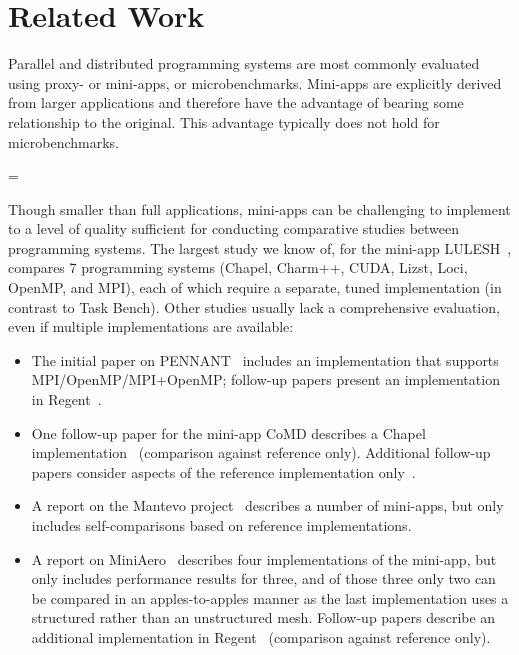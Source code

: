 \section{Related Work}
\label{sec:related-work}

{}

Parallel and distributed programming systems are most
commonly evaluated using proxy- or mini-apps, or
microbenchmarks. Mini-apps are explicitly derived from larger
applications and therefore have the advantage of bearing some
relationship to the original. This advantage typically does not hold
for microbenchmarks.

\brokenpenalty=\oldbrokenpenalty

Though smaller than full applications, mini-apps can be challenging to
implement to a level of quality sufficient for conducting comparative
studies between programming systems. The largest study we know of,
for the mini-app LULESH~\cite{LULESH13}, compares 7 programming
systems (Chapel, Charm++, CUDA, Lizst, Loci, OpenMP, and MPI), each of
which require a separate, tuned implementation (in contrast to
Task Bench). Other
studies usually lack a comprehensive evaluation, even if multiple
implementations are available:

\begin{itemize}

\item
The initial paper on PENNANT~\cite{PENNANT} includes an
implementation that supports MPI/OpenMP/MPI+OpenMP; follow-up papers present an implementation in
Regent~\cite{Regent15, ControlReplication17, LegionTracing18}.

\item
One follow-up paper for the mini-app CoMD describes a Chapel
implementation~\cite{CoMDChapel16} (comparison against reference
only). Additional follow-up papers consider aspects of the reference
implementation only~\cite{CoMDLoadImbalance17,
  CoMDThreadedModels14}.

\item
A report on the Mantevo project~\cite{Mantevo09} describes a number of
mini-apps, but only includes self-comparisons based on reference
implementations.

\item
A report on MiniAero~\cite{SandiaReportManyTaskRuntimes15} describes
four implementations of the mini-app, but only includes performance
results for three, and of those three only two can be compared in an
apples-to-apples manner as the last implementation uses a structured
rather than an unstructured mesh. Follow-up papers describe an
additional implementation in Regent~\cite{Regent15,
  ControlReplication17, LegionTracing18} (comparison against reference
only).

\end{itemize}

